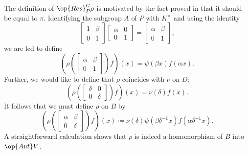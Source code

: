 \documentclass[../main.tex]{subfiles}
\begin{document}
The definition of $\op{Res}^G_P\rho$ is motivated by the fact proved in  that it should be equal to $\pi$. Identifying the subgroup $A$ of $P$ with $K^\times$ and using the identity
\[\begin{bmatrix}
	1 & \beta \\
	0 & 1
\end{bmatrix}\begin{bmatrix}
	\alpha & 0 \\
	0 & 1
\end{bmatrix}=\begin{bmatrix}
	\alpha & \beta \\
	0 & 1
\end{bmatrix},\]
we are led to define
\[\left(\rho\left(\begin{bmatrix}
	\alpha & \beta \\
	0 & 1
\end{bmatrix}\right)f\right)(x)=\psi(\beta x)f(\alpha x).\]
Further, we would like to define that $\rho$ coincides with $\nu$ on $D$:
\[\left(\rho\left(\begin{bmatrix}
	\delta & 0 \\
	0 & \delta
\end{bmatrix}\right)f\right)(x)=\nu(\delta)f(x).\]
It follows that we must define $\rho$ on $B$ by
\begin{equation}
	\left(\rho\left(\begin{bmatrix}
		\alpha & \beta \\
		0 & \delta
	\end{bmatrix}\right)f\right)(x)\coloneqq\nu(\delta)\psi\left(\beta\delta^{-1}x\right)f\left(\alpha\delta^{-1}x\right). \label{eq:def-cusp-b}
\end{equation}
A straightforward calculation shows that $\rho$ is indeed a homomorphism of $B$ into $\op{Aut}V$.
\end{document}
